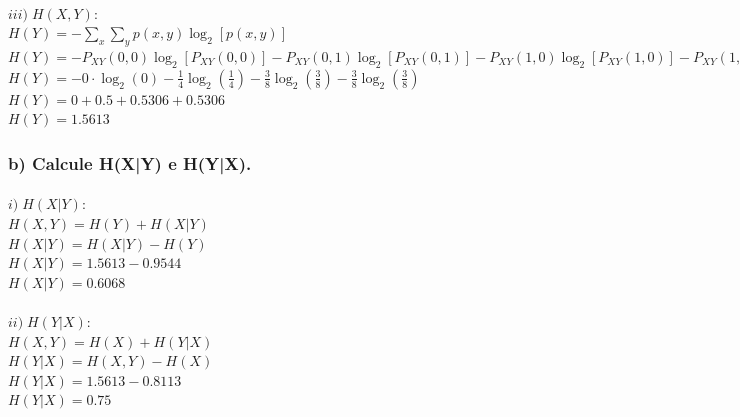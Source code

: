 \documentclass[a4paper]{article}
\begin{document}
\paragraph{$ iii) \; H(X,Y):                                $
\\
$ \displaystyle 
    H(Y) = -\sum_x \sum_y p(x,y) \log_2 [p(x,y)]            $\\
$ H(Y) = - P_{XY}(0,0) \log_2 [P_{XY}(0,0)]                
         - P_{XY}(0,1) \log_2 [P_{XY}(0,1)] 
         - P_{XY}(1,0) \log_2 [P_{XY}(1,0)] 
         - P_{XY}(1,1) \log_2 [P_{XY}(1,1)]                 $\\
$ \displaystyle
    H(Y) = - 0 \cdot \log_2 (0)                              
          - \frac{1}{4} \log_2 \left( \frac{1}{4} \right)
          - \frac{3}{8} \log_2 \left( \frac{3}{8} \right)
          - \frac{3}{8} \log_2 \left( \frac{3}{8} \right)   $\\
$ H(Y) = 0 + 0.5 + 0.5306 + 0.5306                          $\\
$ \boxed{ H(Y) = 1.5613 }                                   $\\
}

\subsubsection{b) Calcule H(X|Y) e H(Y|X).}

\paragraph{$ i) \; H(X|Y):      $
\\
$ H(X,Y) = H(Y) + H(X|Y)        $\\
$ H(X|Y) = H(X|Y) - H(Y)        $\\
$ H(X|Y) = 1.5613 - 0.9544      $\\
$ \boxed{ H(X|Y) = 0.6068 }     $\\
}
\paragraph{$ ii) \; H(Y|X):     $
\\
$ H(X,Y) = H(X) + H(Y|X)        $\\
$ H(Y|X) = H(X,Y) - H(X)        $\\
$ H(Y|X) = 1.5613 - 0.8113      $\\
$ \boxed{ H(Y|X) = 0.75 }       $\\
}
\end{document}

